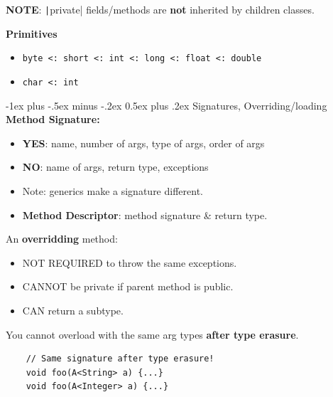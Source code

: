 \documentclass[10pt, landscape]{article}
\makeatletter
\renewcommand{\section}{\@startsection{section}{1}{0mm}%
                                {-1ex plus -.5ex minus -.2ex}%
                                {0.5ex plus .2ex}%
                                {\normalfont\large\bfseries}}
\newcommand{\code}[1]{\textcolor{mygreen}{\texttt{#1}}}
\newcommand{\java}[1]{\texttt|#1|}
\makeatother
\begin{document}
\begin{multicols}{2}
\vspace{3 pt}
\textbf{NOTE}: \java{private} fields/methods are \textbf{not} inherited by children classes. 
\vspace{3 pt}

\textbf{Primitives}
\begin{itemize}
    \item \code{byte <: short <: int <: long <: float <: double}
    \item \code{char <: int}
\end{itemize}



\section{Signatures, Overriding/loading}
\textbf{Method Signature:}
\begin{itemize}
    \item \textbf{YES}: name, number of args, type of args, order of args
    \item \textbf{NO}: name of args, return type, exceptions
    \item Note: generics make a signature different.
    \item \textbf{Method Descriptor}: method signature \& return type.
\end{itemize}

\vspace{2 pt}
An \textbf{overridding} method:
\begin{itemize}
    \item NOT REQUIRED to throw the same exceptions.
    \item CANNOT be private if parent method is public.
    \item CAN return a subtype.
\end{itemize}
You cannot overload with the same arg types \textbf{after type erasure}. 
\begin{verbatim}
    // Same signature after type erasure!
    void foo(A<String> a) {...} 
    void foo(A<Integer> a) {...}
\end{verbatim}



\end{multicols}
\end{document}
